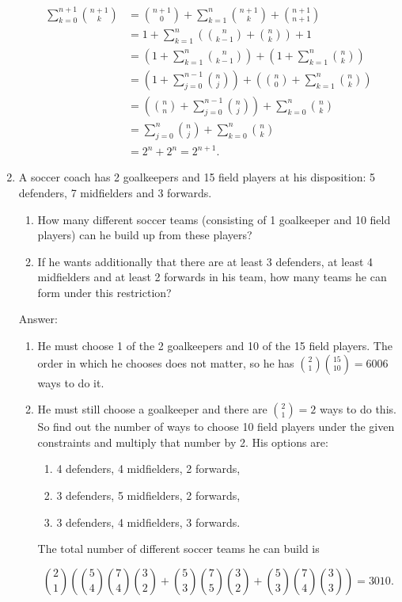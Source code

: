 \documentclass{article}
\begin{document}
\begin{enumerate}
\begin{align*}
\sum_{k=0}^{n+1} \binom{n+1}{k}
&= \binom{n+1}{0} + \sum_{k=1}^{n} \binom{n+1}{k} + \binom{n+1}{n+1} \\
&= 1 + \sum_{k=1}^{n} \left(\binom{n}{k-1} + \binom{n}{k}\right) + 1 \\
&= \left(1 + \sum_{k=1}^n \binom{n}{k-1} \right) + \left(1 + \sum_{k=1}^n \binom{n}{k} \right) \\
&= \left(1 + \sum_{j=0}^{n-1} \binom{n}{j} \right) + \left(\binom{n}{0} + \sum_{k=1}^n \binom{n}{k} \right) \\
&= \left(\binom{n}{n}+ \sum_{j=0}^{n-1} \binom{n}{j} \right) + \sum_{k=0}^n \binom{n}{k} \\
&= \sum_{j=0}^n \binom{n}{j} +  \sum_{k=0}^n \binom{n}{k} \\
&= 2^n + 2^n = 2^{n+1}.
\end{align*}


\item A soccer coach has 2 goalkeepers and 15 field players at his disposition: 5 defenders, 7
midfielders and 3 forwards.

\begin{enumerate}
\item How many different soccer teams (consisting of 1 goalkeeper and 10 field players) can he build up from these players?
\item If he wants additionally that there are at least 3 defenders, at least 4 midfielders and
at least 2 forwards in his team, how many teams he can form under this restriction?
\end{enumerate}  

Answer:

\begin{enumerate}
\item He must choose 1 of the 2 goalkeepers and 10 of the 15 field players. The order in which he chooses does not matter, so he has $\binom{2}{1} \binom{15}{10} = 6006$ ways to do it. 
\item He must still choose a goalkeeper and there are $\binom{2}{1} = 2$ ways to do this. So find out the number of ways to choose 10 field players under the given constraints and multiply that number by 2. His options are:

\begin{enumerate}
\item 4 defenders, 4 midfielders, 2 forwards,
\item 3 defenders, 5 midfielders, 2 forwards,
\item 3 defenders, 4 midfielders, 3 forwards.
\end{enumerate}

The total number of different soccer teams he can build is

$$\binom{2}{1}\left(\binom{5}{4}\binom{7}{4}\binom{3}{2} + \binom{5}{3}\binom{7}{5}\binom{3}{2} + \binom{5}{3}\binom{7}{4}\binom{3}{3}\right) = 3010.
$$
\end{enumerate}

\end{enumerate}
\end{document}
